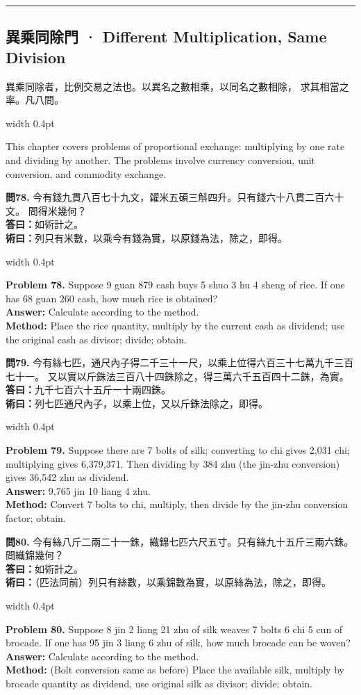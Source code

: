 \documentclass[10pt,a4paper]{article}
\newcommand{\longline}{\noindent\rule{\textwidth}{0.3pt}}
\newlength{\cnwidth}
\newlength{\enwidth}
\newcommand{\bilingual}[2]{%
  \noindent%
  \begin{minipage}[t]{\cnwidth}%
    #1%
  \end{minipage}%
  \hfill\vrule width 0.4pt\hfill%
  \begin{minipage}[t]{\enwidth}%
    #2%
  \end{minipage}%
  \par\smallskip%
}
\newcommand{\bilingualsubsection}[2]{%
  \subsection*{#1 · #2}
}
\begin{document}
\longline


\bilingualsubsection{異乘同除門}{Different Multiplication, Same Division}
\label{sec:yicheng}

\bilingual{%
  異乘同除者，比例交易之法也。以異名之數相乘，以同名之數相除，
  求其相當之率。凡八問。
}{%
  This chapter covers problems of proportional exchange: multiplying by one
  rate and dividing by another. The problems involve currency conversion,
  unit conversion, and commodity exchange.
}

\bilingual{%
  \textbf{問78.}
  今有錢九貫八百七十九文，糴米五碩三斛四升。只有錢六十八貫二百六十文。
  問得米幾何？\\
  \textbf{答曰：}如術計之。\\
  \textbf{術曰：}列只有米數，以乘今有錢為實，以原錢為法，除之，即得。
}{%
  \textbf{Problem 78.}
  Suppose 9 guan 879 cash buys 5 shuo 3 hu 4 sheng of rice.
  If one has 68 guan 260 cash, how much rice is obtained?\\
  \textbf{Answer:} Calculate according to the method.\\
  \textbf{Method:} Place the rice quantity, multiply by the current cash as dividend;
  use the original cash as divisor; divide; obtain.
}

\bilingual{%
  \textbf{問79.}
  今有絲七匹，通尺內子得二千三十一尺，以乘上位得六百三十七萬九千三百七十一。
  又以實以斤銖法三百八十四銖除之，得三萬六千五百四十二銖，為實。\\
  \textbf{答曰：}九千七百六十五斤一十兩四銖。\\
  \textbf{術曰：}列七匹通尺內子，以乘上位，又以斤銖法除之，即得。
}{%
  \textbf{Problem 79.}
  Suppose there are 7 bolts of silk; converting to chi gives 2,031 chi;
  multiplying gives 6,379,371. Then dividing by 384 zhu (the jin-zhu conversion)
  gives 36,542 zhu as dividend.\\
  \textbf{Answer:} 9,765 jin 10 liang 4 zhu.\\
  \textbf{Method:} Convert 7 bolts to chi, multiply, then divide by the jin-zhu
  conversion factor; obtain.
}

\bilingual{%
  \textbf{問80.}
  今有絲八斤二兩二十一銖，織錦七匹六尺五寸。只有絲九十五斤三兩六銖。
  問織錦幾何？\\
  \textbf{答曰：}如術計之。\\
  \textbf{術曰：}（匹法同前）列只有絲數，以乘錦數為實，以原絲為法，除之，即得。
}{%
  \textbf{Problem 80.}
  Suppose 8 jin 2 liang 21 zhu of silk weaves 7 bolts 6 chi 5 cun of brocade.
  If one has 95 jin 3 liang 6 zhu of silk, how much brocade can be woven?\\
  \textbf{Answer:} Calculate according to the method.\\
  \textbf{Method:} (Bolt conversion same as before) Place the available silk,
  multiply by brocade quantity as dividend, use original silk as divisor; divide; obtain.
}
\end{document}
